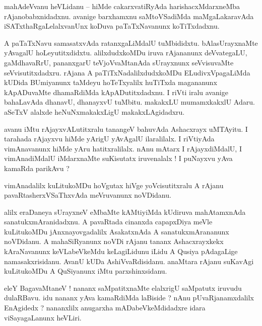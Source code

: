 \documentclass{article}
\begin{document}
\begin{mn}%
mahAdeVvanu heVLidanu -- hiMde cakarxvatiRyAda harishacxMdarxneMba rAjanobabxnidadxnu. avanige 
barxhamxnu saMtoVSadiMda maMgaLakaravAda iSATxthaRgaLelalxvanUnx koDuva paTaTxNavanunx koTiTxdadxnu.
\end{mn}

\begin{mn}%
A paTaTxNavu samasatxvAda ratanxgaLiMdalU tuMbididxtu. bAlasUrayxnaMte yAvagalU hoLeyutitxdidxtu. 
alilxdudxkoMDu iruva rAjananunx deVvategaLU, gaMdhavaRrU, pananxgarU teVjoVvaMtanAda sUrayxnunx 
seVvisuvaMte seVvisutitxdadxru. rAjana A paTiTxNadalilxdudxkoMDu ELudivxVpagaLiMda kUDida 
BUmiyanunx taMdeyu hoTeTxyalilx huTiTxda  magananunx kApADuvaMte dhamaRdiMda kApADutitxdadxnu. I 
riVti iralu avanige bahaLavAda dhanavU, dhanayxvU tuMbitu. makakxLU mumamxkakxlU Adaru. aSeTxV 
alalxde heNuNxmakakxLigU makakxLAgidadxru.
\end{mn}

\begin{mn}%
avanu iMtu rAjayxvALutitxralu tanangeV bahuvAda Ashacxrayx uMTAyitu. I tarahada rAjayxvu hiMde 
yArigU yAvAgalU ilaralilalx. I riVtiyAda vimAnavanunx hiMde yAru hatitxralilalx. nAnu mAtarx I 
rAjayxdiMdalU, I vimAnadiMdalU iMdarxnaMte suKisutatx iruvenalalx ! I puNayxvu yAva kamaRda 
parikAvu ?
\end{mn}

\begin{mn}%
vimAnadalilx kuLitukoMDu hoVgutax hiVge yoVcisutitxralu A rAjanu pavaRtasherxVSaThxvAda meVruvanunx 
noVDidanu.
\end{mn}

\begin{mn}%
alilx eraDaneya sUrayxneV eMbaMte kAMtiyiMda kUdiruva mahAtamxnAda sanatukxmAranidadxnu. A 
pavaRtada cinanxda capapxDiya meVle kuLitukoMDu jAnxnayovgadalilx AsakatxnAda A sanatukxmArananunx 
noVDidanu. A mahaSiRyanunx noVDi rAjanu tananx Ashacxrayxkekx kAraNavanunx keVLabeVkeMdu 
keLagiLidunu iLidu A Qusiya pAdagaLige namasakxrisidanu. AvanU kUDa AshiVvaRdisidanu. anaMtara 
rAjanu suKavAgi kuLitukoMDu A QuSiyanunx iMtu parxshinxsidanu.
\end{mn}

\begin{mn}%
eleY BagavaMtaneV ! nananx saMpatitxnaMte elalxrigU saMpatutx iruvudu dulaRBavu. idu nananx yAva 
kamaRdiMda laBiside ? nAnu pUvaRjanamxdalilx EnAgidedx ? nananxlilx anugarxha mADabeVkeMdidadxre 
idara viSayagaLanunx heVLiri.
\end{mn}
\end{document}
